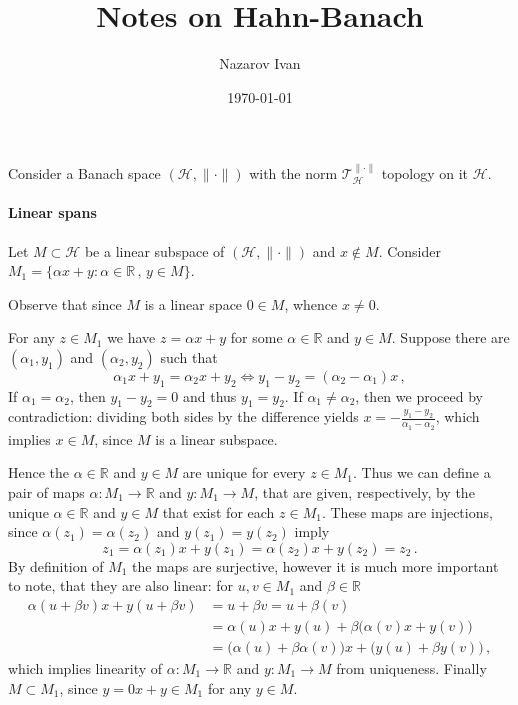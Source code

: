 \documentclass[a4paper]{article}
\title{Notes on Hahn-Banach}
\author{Nazarov Ivan}
\date{\today}
\newcommand{\Hcal}{\mathcal{H}}
\newcommand{\real}{\mathbb{R}}
\newcommand{\Tcal}{\mathcal{T}}
\begin{document}
\maketitle

Consider a Banach space $(\Hcal, \|\cdot\|)$ with the norm $\Tcal^{\|\cdot\|}_\Hcal$
topology on it $\Hcal$.

\paragraph{Linear spans} %
\label{par:linear_spans}

Let $M \subset \Hcal$ be a linear subspace of $(\Hcal, \|\cdot\|)$ and $x \notin M$.
Consider $M_1 = \{\alpha x + y \colon \alpha\in \real\,,\, y \in M\}$.

Observe that since $M$ is a linear space $0\in M$, whence $x \neq 0$.

For any $z\in M_1$ we have $z = \alpha x + y$ for some $\alpha\in \real$ and $y\in M$.
Suppose there are $(\alpha_1, y_1)$ and $(\alpha_2, y_2)$ such that
\begin{equation*}
  \alpha_1 x + y_1 = \alpha_2 x + y_2
  \Leftrightarrow
    y_1 - y_2 = (\alpha_2 - \alpha_1) x
    \,,
\end{equation*}
If $\alpha_1 = \alpha_2$, then $y_1 - y_2 = 0$ and thus $y_1 = y_2$. If $\alpha_1
\neq \alpha_2$, then we proceed by contradiction: dividing both sides by the difference
yields $x = -\tfrac{y_1 - y_2}{\alpha_1 -\alpha_2}$, which implies $x\in M$, since
$M$ is a linear subspace.

Hence the $\alpha\in\real$ and $y\in M$ are unique for every $z \in M_1$. Thus we
can define a pair of maps $\alpha\colon M_1\to \real$ and $y\colon M_1 \to M$, that
are given, respectively, by the unique $\alpha\in\real$ and $y\in M$ that exist for
each $z\in M_1$. These maps are injections, since $\alpha(z_1) = \alpha(z_2)$ and
$y(z_1)=y(z_2)$ imply
\begin{equation*}
  z_1 = \alpha(z_1) x + y(z_1)
    = \alpha(z_2) x + y(z_2)
    = z_2
    \,.
\end{equation*}
By definition of $M_1$ the maps are surjective, however it is much more important
to note, that they are also linear: for $u, v\in M_1$ and $\beta
\in \real$
\begin{align*}
  \alpha(u + \beta v) x + y(u + \beta v)
    &= u + \beta v
    = u + \beta (v)
    \\
    &= \alpha(u) x + y(u)
      + \beta \bigl(\alpha(v) x + y(v) \bigr)
    \\
    &= \bigl( \alpha(u) + \beta\alpha(v) \bigr) x
    + \bigl( y(u) + \beta y(v) \bigr)
    \,,
\end{align*}
which implies linearity of $\alpha\colon M_1\to \real$ and $y\colon M_1\to M$ from
uniqueness. Finally $M\subset M_1$, since $y = 0 x + y \in M_1$ for any $y\in M$.
\end{document}

